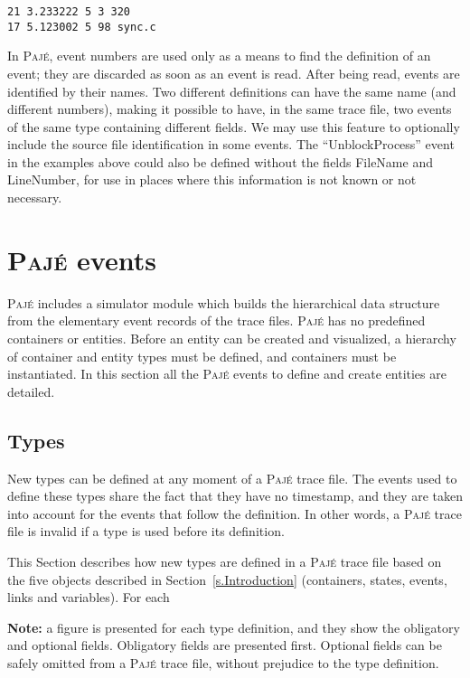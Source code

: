 \documentclass[12pt]{article}
\newcommand{\Paje}{\textsc{Paj\'e}\xspace}
\begin{document}
\begin{verbatim}
21 3.233222 5 3 320
17 5.123002 5 98 sync.c
\end{verbatim}

In \Paje, event numbers are used only as a means to find the
definition of an event; they are discarded as soon as an event is
read.  After being read, events are identified by their names.  Two
different definitions can have the same name (and different numbers),
making it possible to have, in the same trace file, two events of the
same type containing different fields.  We may use this feature to
optionally include the source file identification in some events. The
``UnblockProcess'' event in the examples above could also be defined
without the fields FileName and LineNumber, for use in places where
this information is not known or not necessary.

\section{\Paje events}
\label{s.PajeEvents}

\Paje includes a simulator module which builds the hierarchical data
structure from the elementary event records of the trace files.  \Paje
has no predefined containers or entities.  Before an entity can be
created and visualized, a hierarchy of container and entity types must
be defined, and containers must be instantiated. In this section all
the \Paje events to define and create entities are detailed.

\subsection{Types}
\label{s.Types}

New types can be defined at any moment of a \Paje trace file. The
events used to define these types share the fact that they have no
timestamp, and they are taken into account for the events that follow
the definition. In other words, a \Paje trace file is invalid if a
type is used before its definition.

This Section describes how new types are defined in a \Paje trace file
based on the five objects described in Section~\ref{s.Introduction}
(containers, states, events, links and variables). For each 

{\bf Note:} a figure is presented for each type definition, and they
show the obligatory and optional fields. Obligatory fields are
presented first. Optional fields can be safely omitted from a \Paje
trace file, without prejudice to the type definition.
\end{document}
